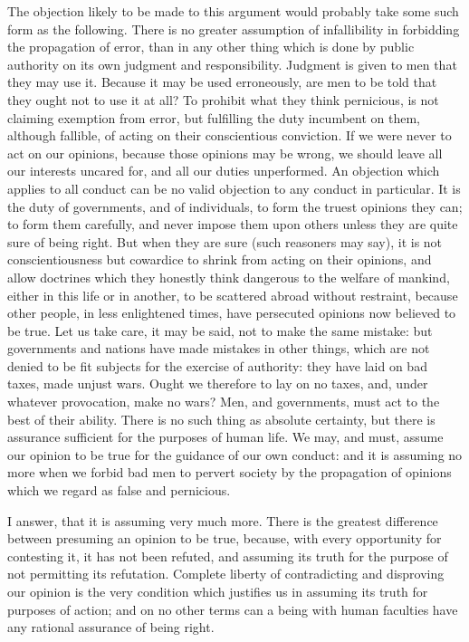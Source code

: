 \documentclass[11pt,openany]{book}
\begin{document}
The objection likely to be made to this argument would probably take some such form as the following. There is no greater assumption of infallibility in forbidding the propagation of error, than in any other thing which is done by public authority on its own judgment and responsibility. Judgment is given to men that they may use it. Because it may be used erroneously, are men to be told that they ought not to use it at all? To prohibit what they think pernicious, is not claiming exemption from error, but fulfilling the duty incumbent on them, although fallible, of acting on their conscientious conviction. If we were never to act on our opinions, because those opinions may be wrong, we should leave all our interests uncared for, and all our duties unperformed. An objection which applies to all conduct can be no valid objection to any conduct in particular. It is the duty of governments, and of individuals, to form the truest opinions they can; to form them carefully, and never impose them upon others unless they are quite sure of being right. But when they are sure (such reasoners may say), it is not conscientiousness but cowardice to shrink from acting on their opinions, and allow doctrines which they honestly think dangerous to the welfare of mankind, either in this life or in another, to be scattered abroad without restraint, because other people, in less enlightened times, have persecuted opinions now believed to be true. Let us take care, it may be said, not to make the same mistake: but governments and nations have made mistakes in other things, which are not denied to be fit subjects for the exercise of authority: they have laid on bad taxes, made unjust wars. Ought we therefore to lay on no taxes, and, under whatever provocation, make no wars? Men, and governments, must act to the best of their ability. There is no such thing as absolute certainty, but there is assurance sufficient for the purposes of human life. We may, and must, assume our opinion to be true for the guidance of our own conduct: and it is assuming no more when we forbid bad men to pervert society by the propagation of opinions which we regard as false and pernicious.

I answer, that it is assuming very much more. There is the greatest difference between presuming an opinion to be true, because, with every opportunity for contesting it, it has not been refuted, and assuming its truth for the purpose of not permitting its refutation. Complete liberty of contradicting and disproving our opinion is the very condition which justifies us in assuming its truth for purposes of action; and on no other terms can a being with human faculties have any rational assurance of being right.
\end{document}

